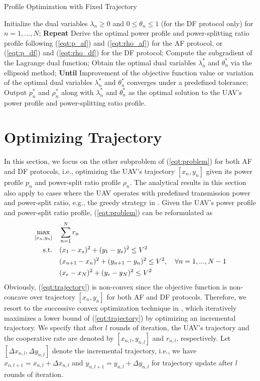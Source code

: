 \documentclass[12pt, draftclsnofoot, onecolumn]{IEEEtran}
\begin{document}
\begin{algorithm}[htb] 
\caption{Profile Optimization with Fixed Trajectory}\label{alg:profile}
\begin{algorithmic}[1]
\STATE Initialize the dual variables $\lambda_{n}\geq 0$ and $0\leq\theta_{n}\leq 1$ (for the DF protocol only) for $n=1,...,N$;
\STATE \textbf{Repeat}
\STATE \quad Derive the optimal power profile and power-splitting ratio profile following (\ref{eqt:p_af}) and (\ref{eqt:rho_af}) for the AF protocol, or (\ref{eqt:p_df}) and (\ref{eqt:rho_df}) for the DF protocol;
\STATE \quad Compute the subgradient of the Lagrange dual function;
\STATE \quad Obtain the optimal dual variables  $\lambda^{*}_{n}$ and $\theta^{*}_{n}$ via the ellipsoid method;
\STATE \textbf{Until} Improvement of the objective function value or variation of the optimal dual variables  $\lambda^{*}_{n}$ and $\theta^{*}_{n}$ converges under a predefined tolerance;
\STATE Output $p^{*}_{n}$ and $\rho^{*}_{n}$ along with $\lambda^{*}_{n}$ and $\theta^{*}_{n}$ as the optimal solution to the UAV's power profile and power-splitting ratio profile.
\end{algorithmic}
\end{algorithm}


\section{Optimizing Trajectory}\label{sec:4}
In this section, we focus on the other subproblem of (\ref{eqt:problem}) for both AF and DF protocols, i.e., optimizing the UAV's trajectory $[x_{n},y_{n}]$ given its power profile $p_{n}$ and power-split ratio profile $\rho_{n}$. The analytical results in this section also apply to cases where the UAV operates with predefined transmission power and power-split ratio, e.g., the greedy strategy in \cite{7417077}. Given the UAV's power profile and power-split ratio profile, (\ref{eqt:problem}) can be reformulated as 
\begin{equation}\label{eqt:trajectory}
\begin{aligned}
\max\limits_{[x_{n},y_{n}]}\quad &\sum\limits _{n=1}^{N}r_{n}\\
{\rm s.t.}\quad &(x_{1}-x_{s})^{2}+(y_{1}-y_{s})^{2}\leq V^{2}\\
&(x_{n+1}-x_{n})^{2}+(y_{n+1}-y_{n})^{2}\leq V^{2},\quad\forall n=1,...,N-1\\
&(x_{e}-x_{N})^{2}+(y_{e}-y_{N})^{2}\leq V^{2}
\end{aligned}
\end{equation}
Obviously, (\ref{eqt:trajectory}) is non-convex since the objective function is non-concave over trajectory $[x_{n},y_{n}]$ for both AF and DF protocols. Therefore, we resort to the successive convex optimization technique in \cite{7572068}, which iteratively maximizes a lower bound of (\ref{eqt:trajectory}) by optimizing an incremental trajectory. We specify that after $l$ rounds of iteration, the UAV's trajectory and the cooperative rate are denoted by $[x_{n,l},y_{n,l}]$ and $r_{n,l}$, respectively. Let $[\Delta x_{n,l},\Delta y_{n,l}]$ denote the incremental trajectory, i.e., we have $x_{n,l+1}=x_{n,l}+\Delta x_{n,l}$ and $y_{n,l+1}=y_{n,l}+\Delta y_{n,l}$ for trajectory update  after $l$ rounds of iteration.
\end{document}
